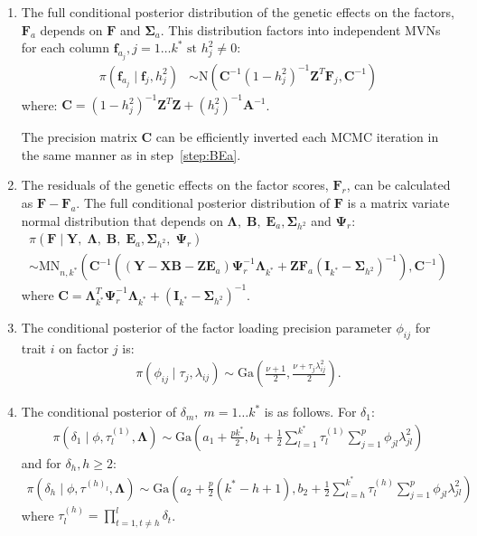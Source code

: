 \documentclass[12pt,titlepage]{article}
\begin{document}
\begin{enumerate}
\item The full conditional posterior distribution of the genetic effects on the factors, $\mathbf{F}_a$ depends on $\mathbf{F}$ and $\mathbf{\Sigma}_a$. This distribution factors into independent MVNs for each column $\mathbf{f}_{a_j}, j = 1 \dots k^* \mbox{ st } h^2_j \neq 0$:
\begin{align*}
\pi\left(\mathbf{f}_{a_j} \mid \mathbf{f}_j, h^2_j \right) &\sim \mbox{N}\left(\mathbf{C}^{-1}(1-h^2_j)^{-1}\mathbf{Z}^T\mathbf{F}_j,\mathbf{C}^{-1}\right)
\end{align*}
\noindent where: $\mathbf{C} = (1-h^2_j)^{-1}\mathbf{Z}^T\mathbf{Z} + (h^2_j)^{-1}\mathbf{A}^{-1}$.

The precision matrix $\mathbf{C}$ can be efficiently inverted each MCMC iteration in the same manner as in step~\ref{step:BEa}.

\item The residuals of the genetic effects on the factor scores, $\mathbf{F}_r$, can be calculated as $\mathbf{F}-\mathbf{F}_a$. The full conditional posterior distribution of $\mathbf{F}$ is a matrix variate normal distribution that depends on $\mathbf{\Lambda}, \; \mathbf{B}, \; \mathbf{E}_a, \mathbf{\Sigma}_{h^2}$ and $\mathbf{\Psi}_r$:
\begin{multline*}
\pi\left(\mathbf{F} \mid \mathbf{Y}, \; \mathbf{\Lambda}, \; \mathbf{B}, \; \mathbf{E}_a, \mathbf{\Sigma}_{h^2}, \; \mathbf{\Psi}_r \right)  \\
\sim \mbox{MN}_{n,k^*}\left(\mathbf{C}^{-1}\left((\mathbf{Y}-\mathbf{X}\mathbf{B} - \mathbf{Z}\mathbf{E}_a)\mathbf{\Psi}_r^{-1}\mathbf{\Lambda}_{k^*} + \mathbf{Z}\mathbf{F}_a(\mathbf{I}_{k^*} - \mathbf{\Sigma}_{h^2})^{-1}\right),\mathbf{C}^{-1}\right)
\end{multline*}
\noindent where $\mathbf{C} = \mathbf{\Lambda}_{k^*}^T \mathbf{\Psi}_r^{-1} \mathbf{\Lambda}_{k^*} +(\mathbf{I}_{k^*} - \mathbf{\Sigma}_{h^2})^{-1}$.

\item The conditional posterior of the factor loading precision parameter $\phi_{ij}$ for trait $i$ on factor $j$ is:
\begin{align*}
\pi(\phi_{ij}\mid \tau_j,\lambda_{ij}) \sim \mbox{Ga}\left(\frac{\nu+1}{2},\frac{\nu + \tau_j\lambda_{ij}^2}{2}\right).
\end{align*}

\item The conditional posterior of $\delta_m, \; m=1\dots k^*$ is as follows. For $\delta_1$:
\begin{align*}
\pi(\delta_1\mid  \phi, \tau^{(1)}_l, \mathbf{\Lambda}) \sim \mbox{Ga}\left(a_1+\frac{pk^*}{2},b_1+\frac{1}{2}\sum\limits_{l=1}^{k^*}\tau_l^{(1)}\sum\limits_{j=1}^p \phi_{jl}\lambda^2_{jl}\right)
\end{align*}
\noindent and for $\delta_h, h\geq 2$:
\begin{align*}
\pi(\delta_h\mid \phi, \tau^{(h)_l}, \mathbf{\Lambda}) \sim \mbox{Ga}\left(a_2+\frac{p}{2}(k^*-h+1),b_2+\frac{1}{2}\sum\limits_{l=h}^{k^*}\tau_l^{(h)}\sum\limits_{j=1}^p \phi_{jl}\lambda^2_{jl}\right)
\end{align*}
\noindent where $\tau_l^{(h)} = \prod\limits_{t=1,t\neq h}^l\delta_t$.


\end{enumerate}
\end{document}
